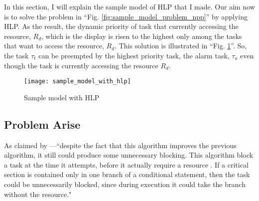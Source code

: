 In this section, I will explain the sample model of HLP that I made. Our aim now is to solve the problem in ``Fig. \ref{fig:sample_model_problem_npp}'' by applying HLP. As the result, the dynamic priority of task that currently accessing the resource, $ R_{d}$, which is the display is risen to the highest only among the tasks that want to access the resource, $ R_{d}$. This solution is illustrated in ``Fig. \ref{fig:sample_model_with_hlp}''. So, the task $ \tau_{t}$ can be preempted by the highest priority task, the alarm task, $\tau_{a}$ even though the task is currently accessing the resource $ R_{d}$.


\begin{figure}[ht]
    \centering
    \texttt{[image: sample\_model\_with\_hlp]}
    \caption{Sample model with HLP}
    \label{fig:sample_model_with_hlp}
\end{figure}


\subsection{Problem Arise}

As claimed by \cite{b5}---``despite the fact that this algorithm improves the previous algorithm, it still could produce some unnecessary blocking. This algorithm block a task at the time it attempts, before it actually require a resource \cite{b5}. If a critical section is contained only in one branch of a conditional statement, then the task could be unnecessarily blocked, since during execution it could take the branch without the resource."
 










